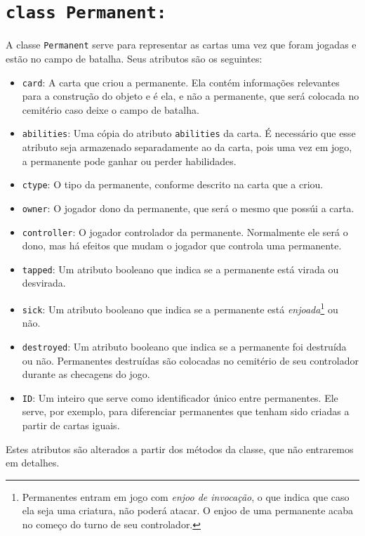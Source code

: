\documentclass[dvipsnames]{book}
\begin{document}
\section{\texttt{class Permanent:}}
A classe \texttt{Permanent} serve para representar as cartas uma vez que foram jogadas
e estão no campo de batalha. Seus atributos são os seguintes:
\begin{itemize}
  \item\texttt{card}: A carta que criou a permanente. Ela contém informações relevantes
  para a construção do objeto e é ela, e não a permanente, que será colocada no cemitério
  caso deixe o campo de batalha.
  \item\texttt{abilities}: Uma cópia do atributo \texttt{abilities} da carta. É necessário
  que esse atributo seja armazenado separadamente ao da carta, pois uma vez em jogo, a
  permanente pode ganhar ou perder habilidades.
  \item\texttt{ctype}: O tipo da permanente, conforme descrito na carta que a criou.
  \item\texttt{owner}: O jogador dono da permanente, que será o mesmo que possúi a carta.
  \item\texttt{controller}: O jogador controlador da permanente. Normalmente ele será o dono,
  mas há efeitos que mudam o jogador que controla uma permanente.
  \item\texttt{tapped}: Um atributo booleano que indica se a permanente está virada ou
  desvirada.
  \item\texttt{sick}: Um atributo booleano que indica se a permanente está
  \textit{enjoada}\footnote{Permanentes entram em jogo com \textit{enjoo de invocação}, o que
  indica que caso ela seja uma criatura, não poderá atacar. O enjoo de uma permanente acaba no
  começo do turno de seu controlador.} ou não.
  \item\texttt{destroyed}: Um atributo booleano que indica se a permanente foi destruída ou não.
  Permanentes destruídas são colocadas no cemitério de seu controlador durante as checagens do jogo.
  \item\texttt{ID}: Um inteiro que serve como identificador único entre permanentes. Ele serve,
  por exemplo, para diferenciar permanentes que tenham sido criadas a partir de cartas iguais.
\end{itemize}
Estes atributos são alterados a partir dos métodos da classe, que não entraremos em detalhes.
\end{document}
